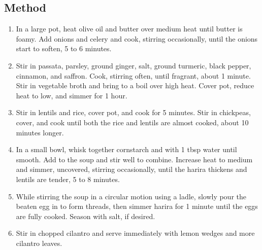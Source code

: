 \subsection{Method}

\begin{enumerate}
    \item In a large pot, heat olive oil and butter over medium heat until butter is foamy. Add onions and celery and cook, stirring occasionally, until the onions start to soften, 5 to 6 minutes.
    \item Stir in passata, parsley, ground ginger, salt, ground turmeric, black pepper, cinnamon, and saffron. Cook, stirring often, until fragrant, about 1 minute.  Stir in vegetable broth and bring to a boil over high heat. Cover pot, reduce heat to low, and simmer for 1 hour.
    \item Stir in lentils and rice, cover pot, and cook for 5 minutes. Stir in chickpeas, cover, and cook until both the rice and lentils are almost cooked, about 10 minutes longer.
    \item In a small bowl, whisk together cornstarch and with 1 tbsp water until smooth. Add to the soup and stir well to combine. Increase heat to medium and simmer, uncovered, stirring occasionally, until the harira thickens and lentils are tender, 5 to 8 minutes.
    \item While stirring the soup in a circular motion using a ladle, slowly pour the beaten egg in to form threads, then simmer harira for 1 minute until the eggs are fully cooked. Season with salt, if desired.
    \item Stir in chopped cilantro and serve immediately with lemon wedges and more cilantro leaves.
\end{enumerate}

